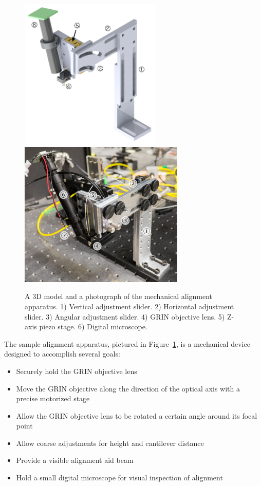 \begin{figure}[h!]
\centering
\includegraphics[width=0.6\textwidth]{Images/Alignment/new_d_2_ann.png}
\\[1em]
\includegraphics[width=0.7\textwidth]{Images/Photographs/DSCF1696_an.jpg}
\caption[3D model and photograph of the mechanical alignment apparatus.]{A 3D model and a  photograph of the mechanical alignment apparatus. 1) Vertical adjustment slider. 2) Horizontal adjustment slider. 3) Angular adjustment slider. 4) GRIN objective lens. 5) Z-axis piezo stage. 6) Digital microscope.\label{fig:alignment_overview}}
\end{figure}


The sample alignment apparatus, pictured in Figure~\ref{fig:alignment_overview}, is a mechanical device designed to accomplish several goals:

\begin{itemize}
	\item Securely hold the GRIN objective lens
	\item Move the GRIN objective along the direction of the optical axis with a precise motorized stage
	\item Allow the GRIN objective lens to be rotated a certain angle around its focal point
	\item Allow coarse adjustments for height and cantilever distance
	\item Provide a visible alignment aid beam
	\item Hold a small digital microscope for visual inspection of alignment
\end{itemize}

